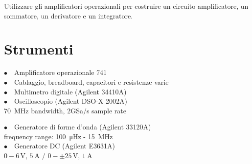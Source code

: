 Utilizzare gli amplificatori operazionali per costruire un circuito amplificatore, un sommatore, un derivatore e un integratore. 

\section{Strumenti}
%
\noindent
\begin{minipage}{.5\linewidth}
$\bullet \quad$Amplificatore operazionale 741\\
$\bullet \quad$Cablaggio, breadboard, capacitori e resistenze varie\\
$\bullet \quad$Multimetro digitale (Agilent 34410A)\\
$\bullet \quad$Oscilloscopio (Agilent DSO-X 2002A)\\
\phantom{xxxx}\SI{70}{\mega\hertz} bandwidth, 2GSa/s sample rate\\
\end{minipage}%
\begin{minipage}{.5\linewidth}
$\bullet \quad$Generatore di forme d'onda (Agilent 33120A)\\
\phantom{xxxx}frequency range: \SI{100}{\micro\hertz} - \SI{15}{\mega\hertz}\\
$\bullet \quad$Generatore DC (Agilent E3631A)\\
\phantom{xxxx}$0-6\,\si{\volt}$, $\SI{5}{\ampere}$ / $0-\pm25\,\si{\volt}$, $\SI{1}{\ampere}$\\
\end{minipage}